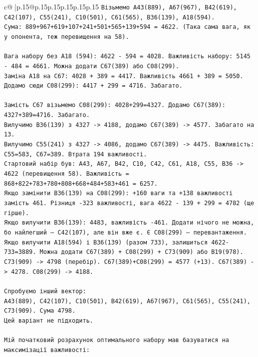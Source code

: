 \documentclass{article}
\begin{document}
{\begin{supertabular}{c@{$\;$}|p{.15\linewidth}@{}p{.15\linewidth}p{.15\linewidth}p{.15\linewidth}p{.15\linewidth}p{.15\linewidth}}
{{{\texttt{Візьмемо A43(889), A67(967), B42(619), C42(107), C55(241), C10(501), C61(565), B36(139), A18(594).} \\
\texttt{Сума: 889+967+619+107+241+501+565+139+594 = 4622. (Така сама вага, як у опонента, теж перевищення на 58).} \\
\\ 
\texttt{Вага набору без A18 (594): 4622 {-} 594 = 4028. Важливість набору: 5145 {-} 484 = 4661. Можна додати C67(389) або C08(299).} \\
\texttt{Заміна A18 на C67: 4028 + 389 = 4417. Важливість 4661 + 389 = 5050.} \\
\texttt{Додамо сюди C08(299): 4417 + 299 = 4716. Забагато.} \\
\\ 
\texttt{Замість C67 візьмемо C08(299): 4028+299=4327. Додамо C67(389): 4327+389=4716. Забагато.} \\
\texttt{Вилучимо B36(139) з 4327 {-}> 4188, додамо C67(389) {-}> 4577. Забагато на 13.} \\
\texttt{Вилучимо C55(241) з 4327 {-}> 4086, додамо C67(389) {-}> 4475. Важливість: C55=583, C67=389. Втрата 194 важливості.} \\
\texttt{Стартовий набір був: A43, A67, B42, C10, C42, C61, A18, C55, B36 {-}> 4622 (перевищення 58). Важливість = 868+822+783+780+808+668+484+583+461 = 6257.} \\
\texttt{Якщо замінити B36(139) на C08(299): +160 ваги та +138 важливості замість 461. Різниця {-}323 важливості, вага 4622 {-} 139 + 299 = 4782 (ще гірше).} \\
\texttt{Якщо вилучити B36(139): 4483, важливість {-}461. Додати нічого не можна, бо найлегший — C42(107), але він вже є. Є C08(299) — перевантаження.} \\
\texttt{Якщо вилучити A18(594) і B36(139) (разом 733), залишиться 4622{-}733=3889. Можна додати C67(389) + C08(299) + C73(909) або B19(978). C73(909) {-}> 4798 (перебір). C67(389)+C08(299) = 4577 (+13). C67(389) {-}> 4278. C08(299) {-}> 4188.} \\
\\ 
\texttt{Спробуємо інший вектор:} \\
\texttt{A43(889), C42(107), C10(501), B42(619), A67(967), C61(565), C55(241), C73(909). Сума 4798.} \\
\texttt{Цей варіант не підходить.} \\
\\ 
\texttt{Мій початковий розрахунок оптимального набору мав базуватися на максимізації важливості:} \\
}}}
\end{supertabular}}
\end{document}

